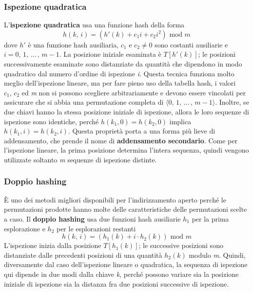 \documentclass[10pt, a4paper]{report}
\begin{document}
\subsubsection{Ispezione quadratica}
L'\textbf{ispezione quadratica} usa una funzione hash della forma
\begin{equation*}
h(k,\,i) = (h'(k) + c_1i + c_2i^2) \text{ mod } m
\end{equation*}
dove $h'$ è una funzione hash ausiliaria, $c_1 \text{ e } c_2 \not= 0$ sono costanti ausiliarie e $i = 0,\,1,\,...\,,\,m - 1$. La posizione iniziale esaminata è $T[h'(k)]$; le posizioni successivamente esaminate sono distanziate da quantità che dipendono in modo quadratico dal numero d'ordine di ispezione \textit{i}. Questa tecnica funziona molto meglio dell'ispezione lineare, ma per fare pieno uso della tabella hash, i valori $c_1,\,c_2$ ed \textit{m} non si possono scegliere arbitrariamente e devono essere vincolati per assicurare che si abbia una permutazione completa di $\langle 0,\,1,\,...\,,\,m - 1  \rangle$. Inoltre, se due chiavi hanno la stessa posizione iniziale di ispezione, allora le loro sequenze di ispezione sono identiche, perché $h(k_1,0) = h(k_2,0)$ implica $h(k_1,i) = h(k_2,i)$. Questa proprietà porta a una forma più lieve di addensamento, che prende il nome di \textbf{addensamento secondario}. Come per l'ispezione lineare, la prima posizione determina l'intera sequenza, quindi vengono utilizzate soltanto \textit{m} sequenze di ispezione distinte.
\subsubsection{Doppio hashing}
È uno dei metodi migliori disponibili per l'indirizzamento aperto perché le permutazioni prodotte hanno molte delle caratteristiche delle permutazioni scelte a caso. Il \textbf{doppio hashing} usa due funzioni hash ausiliarie $h_1$ per la prima esplorazione e $h_2$ per le esplorazioni restanti
\begin{equation*}
h(k,\,i) = (h_1(k) + i\cdot h_2(k)) \text{ mod } m
\end{equation*}
L'ispezione inizia dalla posizione $T[h_1(k)]$; le successive posizioni sono distanziate dalle precedenti posizioni di una quantità $h_2(k)$ modulo \textit{m}. Quindi, diversamente dal caso dell'ispezione lineare o quadratica, la sequenza di ispezione qui dipende in due modi dalla chiave \textit{k}, perché possono variare sia la posizione iniziale di ispezione sia la distanza fra due posizioni successive di ispezione.
\end{document}
